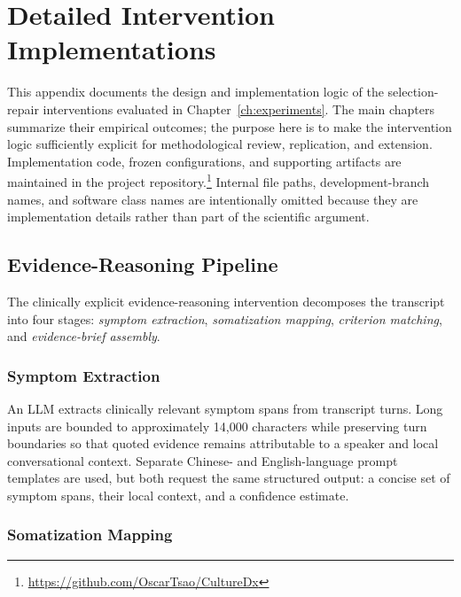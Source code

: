 
\chapter{Detailed Intervention Implementations}
\label{app:interventions}

This appendix documents the design and implementation logic of the
selection-repair interventions evaluated in Chapter~\ref{ch:experiments}.
The main chapters summarize their empirical outcomes; the purpose here is to
make the intervention logic sufficiently explicit for methodological review,
replication, and extension. Implementation code, frozen configurations, and
supporting artifacts are maintained in the project repository.\footnote{\url{https://github.com/OscarTsao/CultureDx}}
Internal file paths, development-branch names, and software class names are
intentionally omitted because they are implementation details rather than part
of the scientific argument.

\section{Evidence-Reasoning Pipeline}
\label{app:evidence}

The clinically explicit evidence-reasoning intervention decomposes the
transcript into four stages:
\emph{symptom extraction}, \emph{somatization mapping},
\emph{criterion matching}, and \emph{evidence-brief assembly}.

\subsection{Symptom Extraction}

An LLM extracts clinically relevant symptom spans from transcript turns.
Long inputs are bounded to approximately 14{,}000 characters while preserving
turn boundaries so that quoted evidence remains attributable to a speaker and
local conversational context. Separate Chinese- and English-language prompt
templates are used, but both request the same structured output: a concise set
of symptom spans, their local context, and a confidence estimate.

\subsection{Somatization Mapping}


